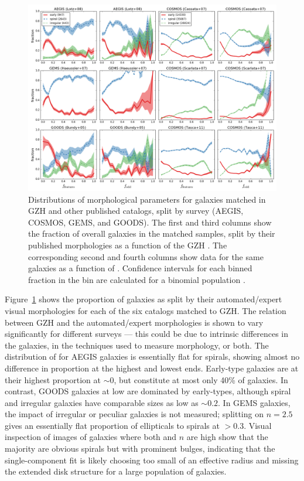 \documentclass[twocolumn]{aastex6}
\begin{document}
\begin{figure}
\center
\includegraphics[width=1.0\textwidth]{figures/comparisons.png}
\caption{Distributions of morphological parameters for galaxies matched in GZH
and other published catalogs, split by survey (AEGIS, COSMOS, GEMS, and GOODS).
The first and third columns show the fraction of overall galaxies in the
matched samples, split by their published morphologies as a function of the GZH
\fbest. The corresponding second and fourth columns show data for the same
galaxies as a function of \fodd. Confidence intervals for each binned fraction
in the bin are calculated for a binomial population \citep{cam11}.}
\label{fig:comparisons}
\end{figure}

Figure~\ref{fig:comparisons} shows the proportion of galaxies as split by their
automated/expert visual morphologies for each of the six catalogs matched to
GZH. The relation between GZH and the automated/expert morphologies is shown to
vary significantly for different surveys --- this could be due to intrinsic
differences in the galaxies, in the techniques used to measure morphology, or
both. The distribution of \fbest{} for AEGIS galaxies is essentially flat for
spirals, showing almost no difference in proportion at the highest and lowest
ends. Early-type galaxies are at their highest proportion at \fbest$\sim0$, but
constitute at most only 40\% of galaxies. In contrast, GOODS galaxies at low
\fbest{} are dominated by early-types, although spiral and irregular galaxies
have comparable sizes as low as \fbest$\sim0.2$. In GEMS galaxies, the impact
of irregular or peculiar galaxies is not measured; splitting on $n=2.5$ gives
an essentially flat proportion of ellipticals to spirals at \fbest$>0.3$.
Visual inspection of images of galaxies where both \fbest{} and $n$ are high
show that the majority are obvious spirals but with prominent bulges,
indicating that the single-component \sersic{} fit is likely choosing too small
of an effective radius and missing the extended disk structure for a large
population of galaxies. 
\end{document}
